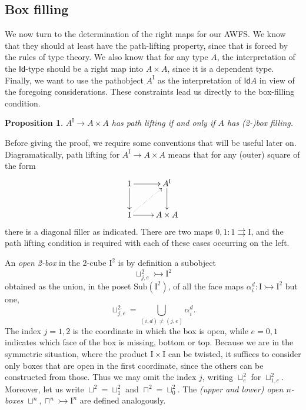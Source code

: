 \documentclass[12pt]{article}
\newcommand{\mono}{\ensuremath{\rightarrowtail}}
\newcommand{\I}{\ensuremath{\mathrm{I}}}
\newcommand{\Id}{\ensuremath{\mathsf{Id}}}
\newtheorem{proposition}[theorem]{Proposition}
\theoremstyle{remark}
\theoremstyle{definition}
\begin{document}
\subsection{Box filling}

We now turn to the determination of the right maps for our AWFS.    We know that they should at least have the path-lifting property, since that is forced by the rules of type theory.  We also know that for any type $A$, the interpretation of the \Id-type should be a right map into $A\times A$, since it is a dependent type. Finally, we want to use the pathobject $A^\I$ as the interpretation of $\Id{A}$ in view of the foregoing considerations. These constraints lead us directly to the box-filling condition.

\begin{proposition}\label{prop:pathliftboxfill}
$A^\I \to A\times A$ has path lifting if and only if $A$ has (2-)box filling.
\end{proposition}

Before giving the proof, we require some conventions that will be useful later on.
Diagramatically, path lifting for $A^\I \to A\times A$ means that for any (outer) square of the form
\begin{equation}\label{diagram:pathliftpath}
\xymatrix{
1 \ar[d] \ar[r] & A^\I \ar[d] \\
\I \ar[r] \ar@{..>}[ru] & A\times A
}
\end{equation}
there is a diagonal filler as indicated.  There are two maps $0,1 : 1\rightrightarrows \I$, and the path lifting condition is required with each of these cases occurring on the left.

An \emph{open 2-box} in the 2-cube $\I^2$ is by definition a subobject $$\sqcup^2_{j,e} \mono \I^2$$ obtained as the union, in the poset $\mathrm{Sub}(\I^2)$, of all the face maps $\alpha^d_i : \I \mono \I^2$ but one,
\[
\sqcup^2_{j,e}  = \bigcup_{(i,d)\neq (j,e)} \alpha_i^d.
\]
The index $j = 1, 2$ is the coordinate in which the box is open, while $e = 0,1$ indicates which face of the box is missing, bottom or top.   Because we are in the symmetric situation, where the product $\I\times \I$ can be twisted, it suffices to  consider only  boxes that are open in the first coordinate, since the others can be constructed from those.  Thus we may omit the index $j$, writing $\sqcup^2_e$ for $\sqcup^2_{1,e}$. Moreover, let us write $\sqcup^2 = {\sqcup}^2_1$ and $\sqcap^2 = {\sqcup}^2_0$.  The \emph{(upper and lower) open $n$-boxes} $\sqcup^n, \sqcap^n \mono \I^n$ are defined analogously.
\end{document}
